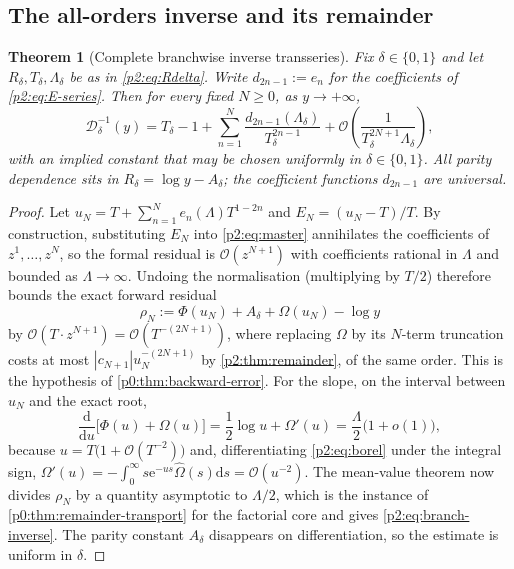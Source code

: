 \documentclass[11pt,a4paper,oneside]{book}
\theoremstyle{plain}
\newtheorem{theorem}{Theorem}[chapter]
\theoremstyle{definition}
\theoremstyle{remark}
\newcommand{\e}{\mathrm{e}}
\newcommand{\dd}{\mathrm{d}}
\newcommand{\bigO}{\mathcal{O}}
\newcommand{\littleo}{o}
\begin{document}
\subsection{The all-orders inverse and its remainder}

\begin{theorem}[Complete branchwise inverse transseries]
\label{p2:thm:branch-inverse}
Fix \(\delta\in\{0,1\}\) and let \(R_\delta,T_\delta,\Lambda_\delta\) be as in
\cref{p2:eq:Rdelta}.  Write \(d_{2n-1}:=e_n\) for the coefficients of
\cref{p2:eq:E-series}.  Then for every fixed \(N\ge0\), as \(y\to+\infty\),
\begin{equation}
 \boxed{\;
 \mathcal D_\delta^{-1}(y)
 =T_\delta-1
 +\sum_{n=1}^{N}\frac{d_{2n-1}(\Lambda_\delta)}{T_\delta^{2n-1}}
 +\bigO\!\left(\frac1{T_\delta^{2N+1}\Lambda_\delta}\right) , \;}
 \label{p2:eq:branch-inverse}
\end{equation}
with an implied constant that may be chosen uniformly in \(\delta\in\{0,1\}\).
All parity dependence sits in \(R_\delta=\log y-A_\delta\); the coefficient
functions \(d_{2n-1}\) are universal.
\end{theorem}

\begin{proof}
Let \(u_N=T+\sum_{n=1}^Ne_n(\Lambda)T^{1-2n}\) and \(E_N=(u_N-T)/T\).  By
construction, substituting \(E_N\) into \cref{p2:eq:master} annihilates the
coefficients of \(z^1,\dots,z^N\), so the formal residual is
\(\bigO(z^{N+1})\) with coefficients rational in \(\Lambda\) and bounded as
\(\Lambda\to\infty\).  Undoing the normalisation (multiplying by \(T/2\))
therefore bounds the exact forward residual
\[
 \rho_N:=\Phi(u_N)+A_\delta+\Omega(u_N)-\log y
\]
by \(\bigO\!\left(T\cdot z^{N+1}\right)=\bigO\!\left(T^{-(2N+1)}\right)\),
where replacing \(\Omega\) by its \(N\)-term truncation costs at most
\(|c_{N+1}|u_N^{-(2N+1)}\) by \cref{p2:thm:remainder}, of the same order.
This is the hypothesis of \cref{p0:thm:backward-error}.  For the slope, on the
interval between \(u_N\) and the exact root,
\[
 \frac{\dd}{\dd u}\bigl[\Phi(u)+\Omega(u)\bigr]
 =\frac12\log u+\Omega'(u)
 =\frac\Lambda2\bigl(1+\littleo(1)\bigr),
\]
because \(u=T\bigl(1+\bigO(T^{-2})\bigr)\) and, differentiating
\cref{p2:eq:borel} under the integral sign,
\(\Omega'(u)=-\int_0^\infty s\e^{-us}\widehat\Omega(s)\dd s=\bigO(u^{-2})\).
The mean-value theorem now divides \(\rho_N\) by a quantity asymptotic to
\(\Lambda/2\), which is the instance of \cref{p0:thm:remainder-transport} for
the factorial core and gives \cref{p2:eq:branch-inverse}.  The parity constant
\(A_\delta\) disappears on differentiation, so the estimate is uniform in
\(\delta\).
\end{proof}
\end{document}
